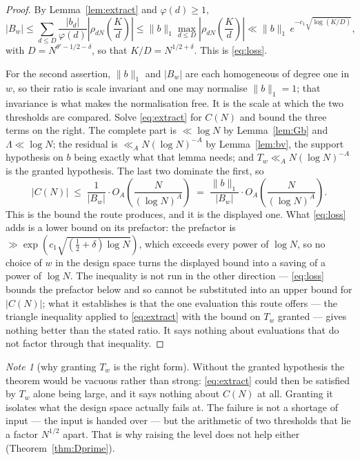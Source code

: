\documentclass[11pt,a4paper]{article}
\theoremstyle{plain}
\theoremstyle{definition}
\theoremstyle{remark}
\newtheorem{note}[theorem]{Note}
\begin{document}
\begin{proof}
By Lemma~\ref{lem:extract} and $\varphi(d)\ge1$,
\[
  |B_w|\le\sum_{d\le D}\frac{|b_d|}{\varphi(d)}
    \left|\rho_{dN}\!\left(\frac Kd\right)\right|
  \le\|b\|_1\max_{d\le D}\left|\rho_{dN}\!\left(\frac Kd\right)\right|
  \ll\|b\|_1\,e^{-c_1\sqrt{\log(K/D)}},
\]
with $D=N^{\theta'-1/2-\delta}$, so that $K/D=N^{1/2+\delta}$. This is
\eqref{eq:loss}.

For the second assertion, $\|b\|_1$ and $|B_w|$ are each homogeneous of
degree one in $w$, so their ratio is scale invariant and one may
normalise $\|b\|_1=1$; that invariance is what makes the normalisation
free. It is the scale at which the two thresholds are compared. Solve
\eqref{eq:extract} for $C(N)$ and bound the three terms on the right.
The complete part is $\ll\log N$ by Lemma~\ref{lem:Gb} and
$\Lambda\ll\log N$; the residual is $\ll_AN(\log N)^{-A}$ by
Lemma~\ref{lem:bv}, the support hypothesis on $b$ being exactly what
that lemma needs; and $T_w\ll_AN(\log N)^{-A}$ is the granted
hypothesis. The last two dominate the first, so
\[
  |C(N)|\;\le\;\frac{1}{|B_w|}
     \cdot O_A\!\left(\frac{N}{(\log N)^{A}}\right)
  \;=\;\frac{\|b\|_1}{|B_w|}
     \cdot O_A\!\left(\frac{N}{(\log N)^{A}}\right).
\]
This is the bound the route produces, and it is the displayed one.
What \eqref{eq:loss} adds is a lower bound on its prefactor: the
prefactor is $\gg\exp(c_1\sqrt{(\frac12+\delta)\log N})$, which
exceeds every power of $\log N$, so no choice of $w$ in the design
space turns the displayed bound into a saving of a power of $\log N$.
The inequality is not run in the other direction --- \eqref{eq:loss}
bounds the prefactor below and so cannot be substituted into an upper
bound for $|C(N)|$; what it establishes is that the one evaluation this
route offers --- the triangle inequality applied to \eqref{eq:extract}
with the bound on $T_w$ granted --- gives nothing better than the
stated ratio. It says nothing about evaluations that do not factor
through that inequality.
\end{proof}

\begin{note}[why granting $T_w$ is the right form]\label{note:granting}
Without the granted hypothesis the theorem would be vacuous rather than
strong: \eqref{eq:extract} could then be satisfied by $T_w$ alone being
large, and it says nothing about $C(N)$ at all. Granting it isolates
what the design space actually fails at. The failure is not a shortage
of input --- the input is handed over --- but the arithmetic of two
thresholds that lie a factor $N^{1/2}$ apart. That is why raising the
level does not help either (Theorem~\ref{thm:Dprime}).
\end{note}
\end{document}
